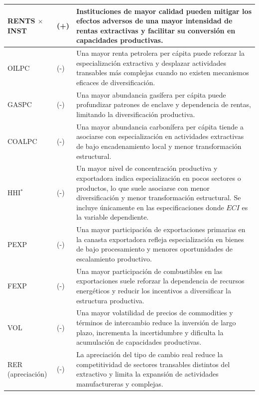 \documentclass[../../PTFM.tex]{subfiles}
\begin{document}
\begin{longtable}{|
			>{\raggedright\arraybackslash}p{}|
			>{\centering\arraybackslash}p{}|
			>{\raggedright\arraybackslash}p{}|}
		RENTS $\times$ INST
		& (+)
		& Instituciones de mayor calidad pueden mitigar los efectos adversos de una mayor intensidad de rentas extractivas y facilitar su conversión en capacidades productivas. \\
		\hline

		OILPC
		& (-)
		& Una mayor renta petrolera per cápita puede reforzar la especialización extractiva y desplazar actividades transables más complejas cuando no existen mecanismos eficaces de diversificación.
		\\
		\hline

		GASPC
		& (-)
		& Una mayor abundancia gasífera per cápita puede profundizar patrones de enclave y dependencia de rentas, limitando la diversificación productiva.
		\\
		\hline

		COALPC
		& (-)
		& Una mayor abundancia carbonífera per cápita tiende a asociarse con especialización en actividades extractivas de bajo encadenamiento local y menor transformación estructural.
		\\
		\hline

		HHI$^{*}$
		& (-)
		& Un mayor nivel de concentración productiva y exportadora indica especialización en pocos sectores o productos, lo que suele asociarse con menor diversificación y menor transformación estructural. Se incluye únicamente en las especificaciones donde $ECI$ es la variable dependiente. \\
		\hline

		PEXP
		& (-)
		& Una mayor participación de exportaciones primarias en la canasta exportadora refleja especialización en bienes de bajo procesamiento y menores oportunidades de escalamiento productivo.
		\\
		\hline

		FEXP
		& (-)
		& Una mayor participación de combustibles en las exportaciones suele reforzar la dependencia de recursos energéticos y reducir los incentivos a diversificar la estructura productiva.
		\\
		\hline

		VOL
		& (-)
		& Una mayor volatilidad de precios de commodities y términos de intercambio reduce la inversión de largo plazo, incrementa la incertidumbre y dificulta la acumulación de capacidades productivas. \\
		\hline

		RER (apreciación)
		& (-)
		& La apreciación del tipo de cambio real reduce la competitividad de sectores transables distintos del extractivo y limita la expansión de actividades manufactureras y complejas. \\
		\hline


\end{longtable}
\end{document}
